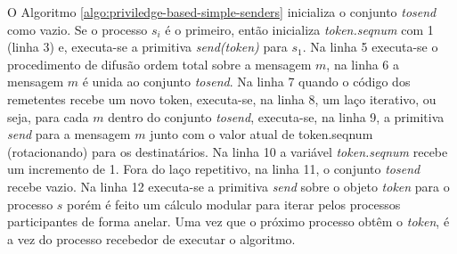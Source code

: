 



\pagebreak



O Algoritmo \ref{algo:priviledge-based-simple-senders} inicializa o conjunto \textit{tosend} como vazio. Se o processo $s_i$ é o primeiro, então inicializa \textit{token.seqnum} com 1 (linha 3) e, executa-se a primitiva \textit{send(token)} para $s_1$. Na linha 5 executa-se o procedimento de difusão ordem total sobre a mensagem $m$, na linha 6 a mensagem $m$ é unida ao conjunto \textit{tosend}. Na linha 7 quando o código dos remetentes recebe um novo token, executa-se, na linha 8, um laço iterativo, ou seja, para cada $m$ dentro do conjunto \textit{tosend}, executa-se, na linha 9, a primitiva \textit{send} para a mensagem $m$ junto com o valor atual de token.seqnum (rotacionando) para os destinatários. Na linha 10 a variável \textit{token.seqnum} recebe um incremento de 1. Fora do laço repetitivo, na linha 11, o conjunto \textit{tosend} recebe vazio. Na linha 12 executa-se a primitiva \textit{send} sobre o objeto \textit{token} para o processo $s$ porém é feito um cálculo modular para iterar pelos processos participantes de forma anelar. Uma vez que o próximo processo obtêm o \textit{token}, é a vez do processo recebedor de executar o algoritmo.

